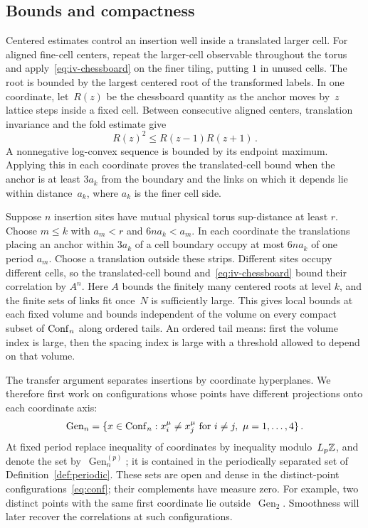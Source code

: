\subsection{Bounds and compactness}\label{subsec:iv-compactness}

Centered estimates control an insertion well inside a translated larger cell.
For aligned fine-cell centers, repeat the larger-cell observable throughout the torus and apply~\eqref{eq:iv-chessboard} on the finer tiling, putting $1$ in unused cells.
The root is bounded by the largest centered root of the transformed labels.
In one coordinate, let~$R(z)$ be the chessboard quantity as the anchor moves by~$z$ lattice steps inside a fixed cell.
Between consecutive aligned centers, translation invariance and the fold estimate give
\begin{equation*}
R(z)^2\le R(z-1)R(z+1)\,.
\end{equation*}
A nonnegative log-convex sequence is bounded by its endpoint maximum.
Applying this in each coordinate proves the translated-cell bound when the anchor is at least $3a_k$ from the boundary and the links on which it depends lie within distance~$a_k$, where $a_k$ is the finer cell side.

Suppose $n$ insertion sites have mutual physical torus sup-distance at least $r$.
Choose $m\le k$ with $a_m<r$ and $6na_k<a_m$.
In each coordinate the translations placing an anchor within $3a_k$ of a cell boundary occupy at most $6na_k$ of one period $a_m$.
Choose a translation outside these strips.
Different sites occupy different cells, so the translated-cell bound and~\eqref{eq:iv-chessboard} bound their correlation by $A^n$.
Here $A$ bounds the finitely many centered roots at level $k$, and the finite sets of links fit once~$N$ is sufficiently large.
This gives local bounds at each fixed volume and bounds independent of the volume on every compact subset of $\operatorname{Conf}_{n}$ along ordered tails.
An ordered tail means: first the volume index is large, then the spacing index is large with a threshold allowed to depend on that volume.

The transfer argument separates insertions by coordinate hyperplanes.
We therefore first work on configurations whose points have different projections onto each coordinate axis:
\begin{equation}\label{eq:iv-coordinate-separated}
\operatorname{Gen}_n
 =\{x\in\Conf n:x_i^\mu\ne x_j^\mu\text{ for }i\ne j,\ \mu=1,\ldots,4\}\,.
\end{equation}
At fixed period replace inequality of coordinates by inequality modulo~$L_p\mathbb Z$, and denote the set by~$\operatorname{Gen}^{(p)}_n$; it is contained in the periodically separated set of Definition~\ref{def:periodic}.
These sets are open and dense in the distinct-point configurations~\eqref{eq:conf}; their complements have measure zero.
For example, two distinct points with the same first coordinate lie outside~$\operatorname{Gen}_2$.
Smoothness will later recover the correlations at such configurations.

